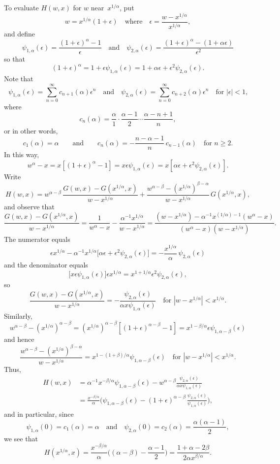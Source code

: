 \documentclass[12pt,a4paper]{article}
\begin{document}
To evaluate $H(w,x)$ for $w$ near~$x^{1/\alpha}$, put
\[
w=x^{1/\alpha}(1+\epsilon)\quad\text{where}\quad 
\epsilon=\frac{w-x^{1/\alpha}}{x^{1/\alpha}},
\]
and define
\[
\psi_{1,\alpha}(\epsilon)=\frac{(1+\epsilon)^\alpha-1}{\epsilon}
\quad\text{and}\quad
\psi_{2,\alpha}(\epsilon)
=\frac{(1+\epsilon)^\alpha-(1+\alpha\epsilon)}{\epsilon^2}
\]
so that
\[
(1+\epsilon)^\alpha=1+\epsilon\psi_{1,\alpha}(\epsilon)=1+\alpha\epsilon
    +\epsilon^2\psi_{2,\alpha}(\epsilon).
\]
Note that
\[
\psi_{1,\alpha}(\epsilon)=\sum_{n=0}^\infty c_{n+1}(\alpha)\epsilon^n
\quad\text{and}\quad
\psi_{2,\alpha}(\epsilon)=\sum_{n=0}^\infty c_{n+2}(\alpha)\epsilon^n
\quad\text{for $|\epsilon|<1$,}
\]
where
\[
c_n(\alpha)=\frac{\alpha}{1}\cdot\frac{\alpha-1}{2}\cdots\frac{\alpha-n+1}{n},
\]
or in other words,
\[
c_1(\alpha)=\alpha\qquad\text{and}\qquad 
c_n(\alpha)=-\frac{n-\alpha-1}{n}\,c_{n-1}(\alpha)
\quad\text{for $n\ge2$.}
\]
In this way,
\[
w^\alpha-x=x[(1+\epsilon)^\alpha-1]=x\epsilon\psi_{1,\alpha}(\epsilon)
    =x[\alpha\epsilon+\epsilon^2\psi_{2,\alpha}(\epsilon)].
\]
Write
\[
H(w,x)=w^{\alpha-\beta}\,\frac{G(w,x)-G(x^{1/\alpha},x)}{w-x^{1/\alpha}}
+\frac{w^{\alpha-\beta}-(x^{1/\alpha})^{\beta-\alpha}}{w-x^{1/\alpha}}
    \,G(x^{1/\alpha},x),
\]
and observe that
\[
\frac{G(w,x)-G(x^{1/\alpha},x)}{w-x^{1/\alpha}}
=\frac{1}{w^\alpha-x}-\frac{\alpha^{-1}x^{1/\alpha}}{w-x^{1/\alpha}}
=\frac{(w-x^{1/\alpha})-\alpha^{-1}x^{(1/\alpha)-1} (w^\alpha-x)}%
{(w^\alpha-x)(w-x^{1/\alpha})}.
\]
The numerator equals
\[
\epsilon x^{1/\alpha}-\alpha^{-1}x^{1/\alpha}\bigl[\alpha\epsilon
    +\epsilon^2\psi_{2,\alpha}(\epsilon)\bigr]
    =-\frac{x^{1/\alpha}}{\alpha}\,\psi_{2,\alpha}(\epsilon)
\]
and the denominator equals
\[
\bigl[x\epsilon\psi_{1,\alpha}(\epsilon)\bigr]\epsilon x^{1/\alpha}
    =x^{1+1/\alpha}\epsilon^2\psi_{2,\alpha}(\epsilon),
\]
so
\[
\frac{G(w,x)-G(x^{1/\alpha},x)}{w-x^{1/\alpha}}
    =-\frac{\psi_{2,\alpha}(\epsilon)}{\alpha x\psi_{1,\alpha}(\epsilon)}
    \quad\text{for $|w-x^{1/\alpha}|<x^{1/\alpha}$.}
\]
Similarly,
\[
w^{\alpha-\beta}-(x^{1/\alpha})^{\alpha-\beta}
    =(x^{1/\alpha})^{\alpha-\beta}[(1+\epsilon)^{\alpha-\beta}-1]
    =x^{1-\beta/\alpha}\epsilon\psi_{1,\alpha-\beta}(\epsilon)
\]
and hence
\[
\frac{w^{\alpha-\beta}-(x^{1/\alpha})^{\beta-\alpha}}{w-x^{1/\alpha}}
    =x^{1-(1+\beta)/\alpha}\psi_{1,\alpha-\beta}(\epsilon)
    \quad\text{for $|w-x^{1/\alpha}|<x^{1/\alpha}$.}
\]
Thus,
\begin{align*}
H(w,x)&=\alpha^{-1}x^{-\beta/\alpha}\psi_{1,\alpha-\beta}(\epsilon)
-w^{\alpha-\beta}\frac{\psi_{2,\alpha}(\epsilon)}%
{\alpha x\psi_{1,\alpha}(\epsilon)}\\
    &=\frac{x^{-\beta/\alpha}}{\alpha}\biggl(\psi_{1,\alpha-\beta}(\epsilon)
    -(1+\epsilon)^{\alpha-\beta}\,\frac{\psi_{2,\alpha}(\epsilon)}%
{\psi_{1,\alpha}(\epsilon)}\biggr),
\end{align*}
and in particular, since
\[
\psi_{1,\alpha}(0)=c_1(\alpha)=\alpha
\quad\text{and}\quad
\psi_{2,\alpha}(0)=c_2(\alpha)=\frac{\alpha(\alpha-1)}{2},
\]
we see that
\[
H(x^{1/\alpha},x)=\frac{x^{-\beta/\alpha}}{\alpha}\biggl((\alpha-\beta)
    -\frac{\alpha-1}{2}\biggr)=\frac{1+\alpha-2\beta}{2\alpha x^{\beta/\alpha}}.
\]
\end{document}

